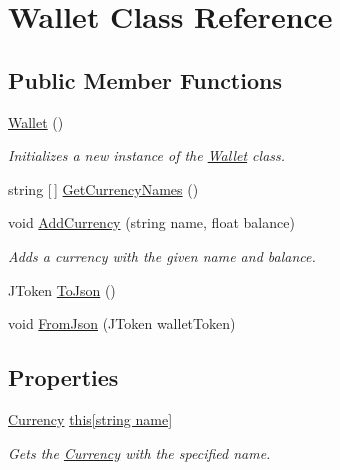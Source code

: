 \hypertarget{class_wallet}{}\section{Wallet Class Reference}
\label{class_wallet}
\subsection*{Public Member Functions}
\begin{DoxyCompactItemize}
\item 
\hyperlink{class_wallet_ac9a00180a49eb21e07c8fff305604a67}{Wallet} ()
\begin{DoxyCompactList}\small\item\em Initializes a new instance of the \hyperlink{class_wallet}{Wallet} class. \end{DoxyCompactList}\item 
string \mbox{[}$\,$\mbox{]} \hyperlink{class_wallet_a4512e9639bd8fb8803eb84acb44eab40}{Get\+Currency\+Names} ()
\item 
void \hyperlink{class_wallet_ac0d658fdcc4062427fd1eaf828b00472}{Add\+Currency} (string name, float balance)
\begin{DoxyCompactList}\small\item\em Adds a currency with the given name and balance. \end{DoxyCompactList}\item 
J\+Token \hyperlink{class_wallet_a55bfd77761cd69e935960ede23a71e2a}{To\+Json} ()
\item 
void \hyperlink{class_wallet_a43449073506217924f905adc90b5a2e8}{From\+Json} (J\+Token wallet\+Token)
\end{DoxyCompactItemize}
\subsection*{Properties}
\begin{DoxyCompactItemize}
\item 
\hyperlink{class_currency}{Currency} \hyperlink{class_wallet_a7a0b160460a0749074db2943feda130e}{this\mbox{[}string name\mbox{]}}
\begin{DoxyCompactList}\small\item\em Gets the \hyperlink{class_currency}{Currency} with the specified name. \end{DoxyCompactList}\end{DoxyCompactItemize}


